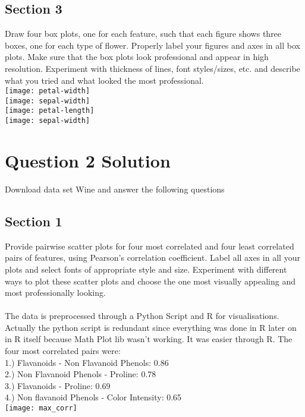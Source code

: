 \documentclass[12pt,a4paper,titlepage]{article}
\begin{document}
{{\subsection{Section 3}{
Draw four box plots, one for each feature, such that each figure shows three boxes, one for each type of flower. Properly label your figures and axes in all box plots. Make sure that the box plots look professional and appear in high resolution. Experiment with thickness of lines, font styles/sizes, etc. and describe what you tried and what looked the most professional.\\
\centering
\texttt{[image: petal-width]}\\
\texttt{[image: sepal-width]}\\
\texttt{[image: petal-length]}\\
\texttt{[image: sepal-width]}\\
}\label{sub:sub3}
}



\section{Question 2 Solution}{
Download data set Wine and answer the following questions
\subsection{Section 1}{
Provide pairwise scatter plots for four most correlated and four least correlated pairs of features, using Pearson's correlation coefficient. Label all axes in all your plots and select fonts of appropriate style and size. Experiment with different ways to plot these scatter plots and choose the one most visually appealing and most professionally looking.\\~\\
\centering
The data is preprocessed through a Python Script and R for visualisations. Actually the python script is redundant since everything was done in R later on in R itself because Math Plot lib wasn't working. It was easier through R.
The four most correlated pairs were:\\
1.) Flavanoids - Non Flavanoid Phenols: 0.86\\
2.) Non Flavanoid Phenols - Proline: 0.78\\
3.) Flavanoids - Proline: 0.69\\
4.) Non flavanoid Phenols - Color Intensity: 0.65\\
\texttt{[image: max\_corr]}\\

}}}
\end{document}
